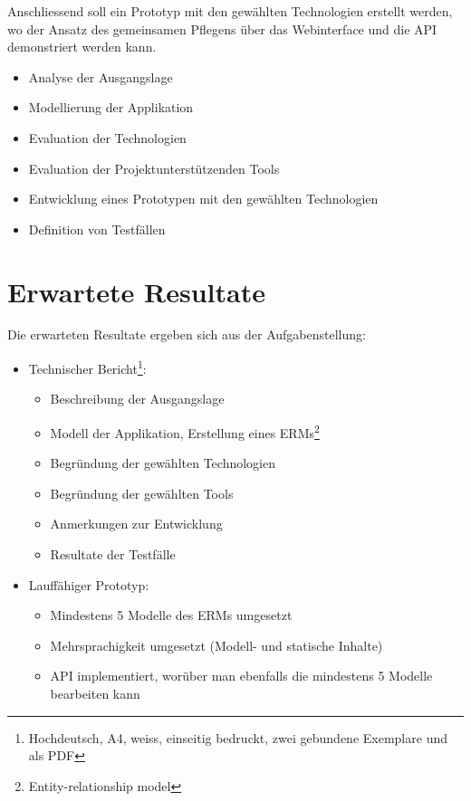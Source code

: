 \documentclass[]{scrreprt}
\begin{document}
    Anschliessend soll ein Prototyp mit den gewählten Technologien erstellt
    werden, wo der Ansatz des gemeinsamen Pflegens über das Webinterface und 
    die API demonstriert werden kann.
    
    \begin{itemize}
        \item Analyse der Ausgangslage
        \item Modellierung der Applikation
        \item Evaluation der Technologien
        \item Evaluation der Projektunterstützenden Tools
        \item Entwicklung eines Prototypen mit den gewählten Technologien
        \item Definition von Testfällen
    \end{itemize}

    \section{Erwartete Resultate}
    Die erwarteten Resultate ergeben sich aus der Aufgabenstellung:
    
    \begin{itemize}
        \item Technischer Bericht\footnote{Hochdeutsch, A4, weiss, einseitig 
            bedruckt, zwei gebundene Exemplare und als PDF}:
        \begin{itemize}
            \item Beschreibung der Ausgangslage
            \item Modell der Applikation, Erstellung eines ERMs\footnote{
                Entity-relationship model}
            \item Begründung der gewählten Technologien
            \item Begründung der gewählten Tools
            \item Anmerkungen zur Entwicklung
            \item Resultate der Testfälle
        \end{itemize}
    	\item Lauffähiger Prototyp:
    	\begin{itemize}
            \item Mindestens 5 Modelle des ERMs umgesetzt
            \item Mehrsprachigkeit umgesetzt (Modell- und statische 
                Inhalte)
            \item API implementiert, worüber man ebenfalls die mindestens 5 
                Modelle bearbeiten kann
        \end{itemize}
    \end{itemize}
\end{document}
